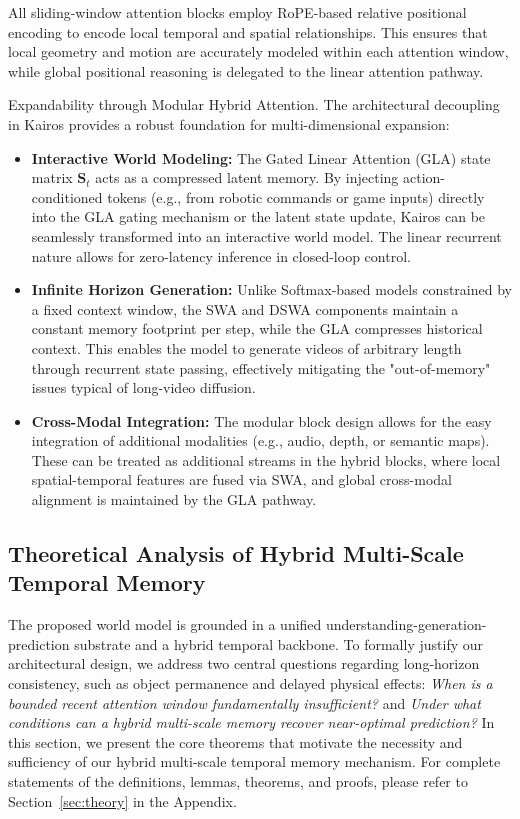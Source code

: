\documentclass{llmxive}
\begin{document}
All sliding-window attention blocks employ RoPE-based relative positional encoding to encode local temporal and spatial relationships. This ensures that local geometry and motion are accurately modeled within each attention window, while global positional reasoning is delegated to the linear attention pathway.


Expandability through Modular Hybrid Attention. The architectural decoupling in Kairos provides a robust foundation for multi-dimensional expansion:

\begin{itemize}

\item \textbf{Interactive World Modeling:} The Gated Linear Attention (GLA) state matrix $\mathbf{S}_t$ acts as a compressed latent memory. By injecting action-conditioned tokens (e.g., from robotic commands or game inputs) directly into the GLA gating mechanism or the latent state update, Kairos can be seamlessly transformed into an interactive world model. The linear recurrent nature allows for zero-latency inference in closed-loop control.

\item \textbf{Infinite Horizon Generation:} Unlike Softmax-based models constrained by a fixed context window, the SWA and DSWA components maintain a constant memory footprint per step, while the GLA compresses historical context. This enables the model to generate videos of arbitrary length through recurrent state passing, effectively mitigating the "out-of-memory" issues typical of long-video diffusion.

\item \textbf{Cross-Modal Integration:} The modular block design allows for the easy integration of additional modalities (e.g., audio, depth, or semantic maps). These can be treated as additional streams in the hybrid blocks, where local spatial-temporal features are fused via SWA, and global cross-modal alignment is maintained by the GLA pathway.

\end{itemize}



\subsection{Theoretical Analysis of Hybrid Multi-Scale Temporal Memory}



The proposed world model is grounded in a unified understanding-generation-prediction substrate and a hybrid temporal backbone. To formally justify our architectural design, we address two central questions regarding long-horizon consistency, such as object permanence and delayed physical effects: \textit{When is a bounded recent attention window fundamentally insufficient?} and \textit{Under what conditions can a hybrid multi-scale memory recover near-optimal prediction?} In this section, we present the core theorems that motivate the necessity and sufficiency of our hybrid multi-scale temporal memory mechanism. For complete statements of the definitions, lemmas, theorems, and proofs, please refer to Section~\ref{sec:theory} in the Appendix.
\end{document}
